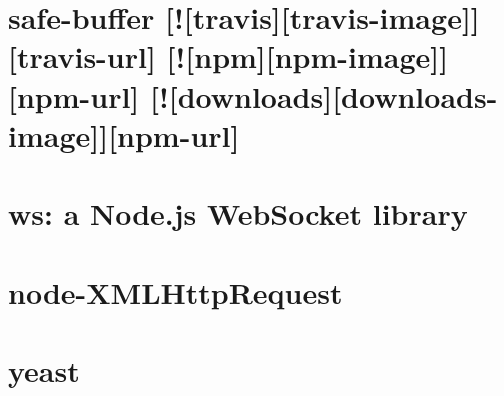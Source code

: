 \documentclass[twoside]{book}
\newcommand{\+}{\discretionary{\mbox{\scriptsize$\hookleftarrow$}}{}{}}
\begin{document}
\chapter{safe-\/buffer \mbox{[}!\mbox{[}travis\mbox{]}\mbox{[}travis-\/image\mbox{]}\mbox{]}\mbox{[}travis-\/url\mbox{]} \mbox{[}!\mbox{[}npm\mbox{]}\mbox{[}npm-\/image\mbox{]}\mbox{]}\mbox{[}npm-\/url\mbox{]} \mbox{[}!\mbox{[}downloads\mbox{]}\mbox{[}downloads-\/image\mbox{]}\mbox{]}\mbox{[}npm-\/url\mbox{]}}
\label{md_bin_node_modules_socket_8io_node_modules_socket_8io-client_node_modules_engine_8io-client_nod27b929f020d3bc244fbb8729748771a8}

\chapter{ws\+: a Node.\+js Web\+Socket library}
\label{md_bin_node_modules_socket_8io_node_modules_socket_8io-client_node_modules_engine_8io-client_node_modules_ws__r_e_a_d_m_e}

\chapter{node-\/\+X\+M\+L\+Http\+Request}
\label{md_bin_node_modules_socket_8io_node_modules_socket_8io-client_node_modules_engine_8io-client_nod4e365cb5618f69f1e7a4e0190726efd3}

\chapter{yeast}
\label{md_bin_node_modules_socket_8io_node_modules_socket_8io-client_node_modules_engine_8io-client_node_modules_yeast__r_e_a_d_m_e}

\end{document}
